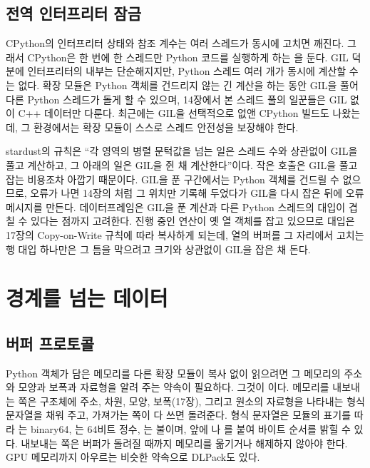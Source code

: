 \subsection{전역 인터프리터 잠금}

CPython의 인터프리터 상태와 참조 계수는 여러 스레드가 동시에 고치면 깨진다. 그래서 CPython은 한 번에 한 스레드만 Python 코드를 실행하게 하는 을 둔다. GIL 덕분에 인터프리터의 내부는 단순해지지만, Python 스레드 여러 개가 동시에 계산할 수는 없다. 확장 모듈은 Python 객체를 건드리지 않는 긴 계산을 하는 동안 GIL을 풀어 다른 Python 스레드가 돌게 할 수 있으며, 14장에서 본 스레드 풀의 일꾼들은 GIL 없이 C++ 데이터만 다룬다. 최근에는 GIL을 선택적으로 없앤 CPython 빌드도 나왔는데\cite{pep703}, 그 환경에서는 확장 모듈이 스스로 스레드 안전성을 보장해야 한다.

\begin{instardust}
stardust의 규칙은 ``각 영역의 병렬 문턱값을 넘는 일은 스레드 수와 상관없이 GIL을 풀고 계산하고, 그 아래의 일은 GIL을 쥔 채 계산한다''이다. 작은 호출은 GIL을 풀고 잡는 비용조차 아깝기 때문이다. GIL을 푼 구간에서는 Python 객체를 건드릴 수 없으므로, 오류가 나면 14장의 처럼 그 위치만 기록해 두었다가 GIL을 다시 잡은 뒤에 오류 메시지를 만든다. 데이터프레임은 GIL을 푼 계산과 다른 Python 스레드의 대입이 겹칠 수 있다는 점까지 고려한다. 진행 중인 연산이 옛 열 객체를 잡고 있으므로 대입은 17장의 Copy-on-Write 규칙에 따라 복사하게 되는데, 열의 버퍼를 그 자리에서 고치는 행 대입 하나만은 그 틈을 막으려고 크기와 상관없이 GIL을 잡은 채 돈다.
\end{instardust}

\section{경계를 넘는 데이터}
\label{sec:crossing}

\subsection{버퍼 프로토콜}

Python 객체가 담은 메모리를 다른 확장 모듈이 복사 없이 읽으려면 그 메모리의 주소와 모양과 보폭과 자료형을 알려 주는 약속이 필요하다. 그것이 이다\cite{pep3118}. 메모리를 내보내는 쪽은  구조체에 주소, 차원, 모양, 보폭(17장), 그리고 원소의 자료형을 나타내는 형식 문자열을 채워 주고, 가져가는 쪽이 다 쓰면 돌려준다. 형식 문자열은  모듈의 표기를 따라 는 binary64, 는 $64$비트 정수, 는 불이며, 앞에 \code{<}나 \code{>}를 붙여 바이트 순서를 밝힐 수 있다. 내보내는 쪽은 버퍼가 돌려질 때까지 메모리를 옮기거나 해제하지 않아야 한다. GPU 메모리까지 아우르는 비슷한 약속으로 DLPack도 있다\cite{dlpack}.

